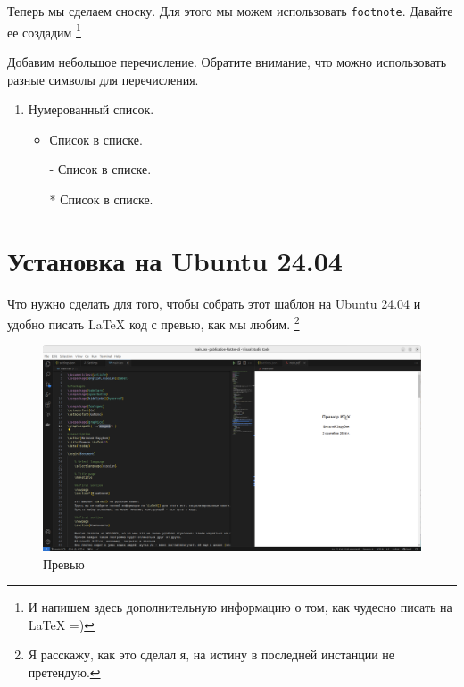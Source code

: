 \documentclass{article}
\begin{document}
    Теперь мы сделаем сноску. Для этого мы можем использовать \texttt{footnote}.
    Давайте ее создадим
    \footnote{
        И напишем здесь дополнительную информацию о том, как чудесно писать на \LaTeX{} =)
    }

    Добавим небольшое перечисление.
    Обратите внимание, что можно использовать разные символы для перечисления.

    \begin{enumerate}
        \item Нумерованный список.
        \begin{itemize}
            \item Список в списке.
            \item[-] Список в списке.
            \item[*] Список в списке.
        \end{itemize}
    \end{enumerate}

    \newpage
    \section{Установка на Ubuntu 24.04}

    Что нужно сделать для того, чтобы собрать этот шаблон на Ubuntu 24.04 и удобно писать \LaTeX{} код с превью, как мы любим.
    \footnote{
        Я расскажу, как это сделал я, на истину в последней инстанции не претендую.
    }

    \begin{figure}[h]
        \centering
        \includegraphics[width=\linewidth]{preview}
        \caption{Превью}
    \end{figure}
\end{document}
